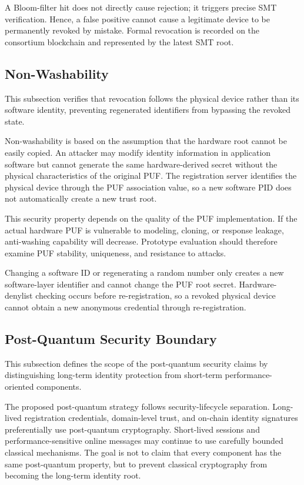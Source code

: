 \documentclass[lettersize,journal]{IEEEtran}
\begin{document}
	A Bloom-filter hit does not directly cause rejection; it triggers precise SMT verification. Hence, a false positive cannot cause a legitimate device to be permanently revoked by mistake. Formal revocation is recorded on the consortium blockchain and represented by the latest SMT root.
	
	\subsection{Non-Washability}
	This subsection verifies that revocation follows the physical device rather than its software identity, preventing regenerated identifiers from bypassing the revoked state.
	
	
	Non-washability is based on the assumption that the hardware root cannot be easily copied. An attacker may modify identity information in application software but cannot generate the same hardware-derived secret without the physical characteristics of the original PUF. The registration server identifies the physical device through the PUF association value, so a new software PID does not automatically create a new trust root.
	
	This security property depends on the quality of the PUF implementation. If the actual hardware PUF is vulnerable to modeling, cloning, or response leakage, anti-washing capability will decrease. Prototype evaluation should therefore examine PUF stability, uniqueness, and resistance to attacks.
	
	Changing a software ID or regenerating a random number only creates a new software-layer identifier and cannot change the PUF root secret. Hardware-denylist checking occurs before re-registration, so a revoked physical device cannot obtain a new anonymous credential through re-registration.
	
	\subsection{Post-Quantum Security Boundary}
	This subsection defines the scope of the post-quantum security claims by distinguishing long-term identity protection from short-term performance-oriented components.
	
	
	The proposed post-quantum strategy follows security-lifecycle separation. Long-lived registration credentials, domain-level trust, and on-chain identity signatures preferentially use post-quantum cryptography. Short-lived sessions and performance-sensitive online messages may continue to use carefully bounded classical mechanisms. The goal is not to claim that every component has the same post-quantum property, but to prevent classical cryptography from becoming the long-term identity root.
	
\end{document}
